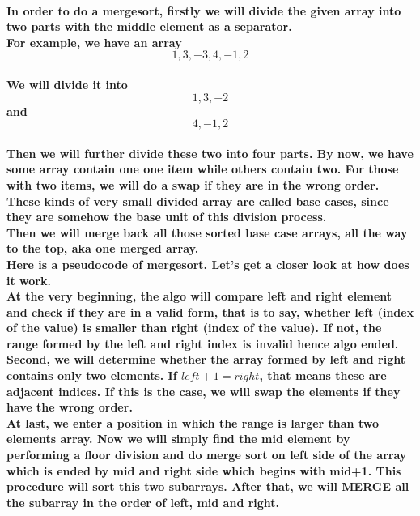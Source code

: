 \documentclass{article}
\begin{document}
\paragraph{In order to do a mergesort, firstly we will divide the given array into two parts with the middle element as a separator.\\
For example, we have an array \[1,3,-3,4,-1,2\]\\ We will divide it into \[1,3,-2\] and \[4,-1,2\]\\
Then we will further divide these two into four parts. By now, we have some array contain one one item while others contain two. For those with two items, we will do a swap if they are in the wrong order.\\
These kinds of very small divided array are called base cases, since they are somehow the base unit of this division process.\\
Then we will merge back all those sorted base case arrays, all the way to the top, aka one merged array.\\
Here is a pseudocode of mergesort. Let's get a closer look at how does it work.\\
At the very beginning, the algo will compare left and right element and check if they are in a valid form, that is to say, whether left (index of the value) is smaller than right (index of the value). If not, the range formed by the left and right index is invalid hence algo ended.\\
Second, we will determine whether the array formed by left and right contains only two elements. If $left + 1 = right$, that means these are adjacent indices. If this is the case, we will swap the elements if they have the wrong order.\\
At last, we enter a position in which the range is larger than two elements array. Now we will simply find the mid element by performing a floor division and do merge sort on left side of the array which is ended by mid and right side which begins with mid+1. 
This procedure will sort this two subarrays. After that, we will MERGE all the subarray in the order of left, mid and right.\\}
\end{document}
